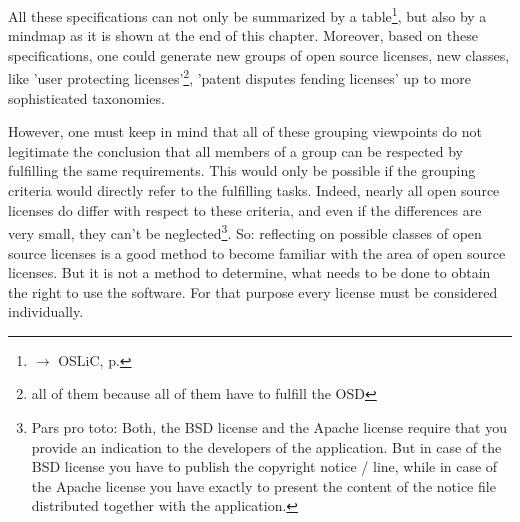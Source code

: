 All these specifications can not only be summarized by a
table\footnote{$\rightarrow$ OSLiC, p. \pageref{tab:powerOfLicenses}}, but also
by a mindmap as it is shown at the end of this chapter. Moreover, based on these
specifications, one could generate new groups of open source licenses, new
classes, like 'user protecting licenses'\footnote{all of them because all of
them have to fulfill the OSD}, 'patent disputes fending licenses' up to more
sophisticated taxonomies.

However, one must keep in mind that all of these grouping viewpoints do not
legitimate the conclusion that all members of a group can be respected by
fulfilling the same requirements. This would only be possible if the grouping
criteria would directly refer to the fulfilling tasks. Indeed, nearly all open
source licenses do differ with respect to these criteria, and even if the
differences are very small, they can't be neglected\footnote{Pars pro toto:
Both, the BSD license and the Apache license require that you provide an
indication to the developers of the application. But in case of the BSD license
you have to publish the copyright notice / line, while in case of the Apache
license you have exactly to present the content of the notice file distributed
together with the application.}. So: reflecting on possible classes of open
source licenses is a good method to become familiar with the area of open source
licenses. But it is not a method to determine, what needs to be done to
obtain the right to use the software. For that purpose every license must be
considered individually.


